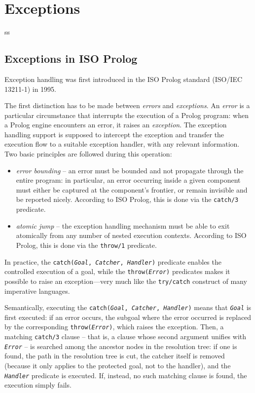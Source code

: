 \chapter{\tuprolog{} Exceptions}
ss\label{ch:exceptions}

\section{Exceptions in ISO Prolog}
\label{sec:exceptions in ISO prolog}
Exception handling was first introduced in the ISO Prolog standard (ISO/IEC 13211-1) in 1995.

The first distinction has to be made between \textit{errors} and \textit{exceptions}.
%
An \textit{error} is a particular circumstance that interrupts the execution of a Prolog program: when a Prolog engine encounters an error, it raises an \textit{exception}.
%
The exception handling support is supposed to intercept the exception and transfer the execution flow to a suitable exception handler, with any relevant information. Two basic principles are followed during this operation:

\begin{itemize}
  \item \textit{error bounding} -- an error must be bounded and not propagate through the entire program: in particular, an error occurring inside a given component must either be captured at the component's frontier, or remain invisible and be reported nicely.
      According to ISO Prolog, this is done via the \texttt{catch/3} predicate.

  \item \textit{atomic jump} -- the exception handling mechanism must be able to exit atomically from any number of nested execution contexts. According to ISO Prolog, this is done via the \texttt{throw/1} predicate.
\end{itemize}
%
In practice, the \texttt{catch(\textit{Goal}, \textit{Catcher}, \textit{Handler})} predicate enables the controlled execution of a goal, while the \texttt{throw(\textit{Error})} predicates makes it possible to raise an exception---very much like the \texttt{try/catch} construct of many imperative languages.

Semantically, executing the \texttt{catch(\textit{Goal}, \textit{Catcher}, \textit{Handler})} means that \texttt{\textit{Goal}} is first executed: if an error occurs, the subgoal where the error occurred is replaced by the corresponding \texttt{throw(\textit{Error})}, which raises the exception.
%
Then, a matching \texttt{catch/3} clause -- that is, a clause whose second argument
unifies with \texttt{\textit{Error}} -- is searched among the ancestor nodes in the resolution tree: if one is found, the path in the resolution tree is cut, the catcher itself is removed (because it only applies to the protected goal, not to the handler), and the \texttt{\textit{Handler}} predicate is executed. If, instead, no such matching clause is found, the execution simply fails.

